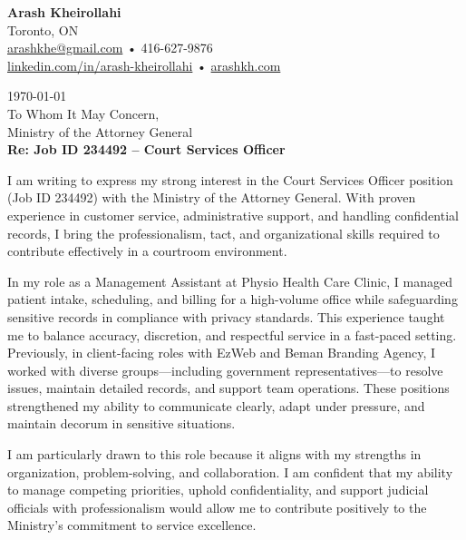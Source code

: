 \documentclass[letterpaper,10pt]{article}
\begin{document}

{\LARGE \textbf{Arash Kheirollahi}}\\[0.2em]
Toronto, ON \\
\href{mailto:arashkhe@gmail.com}{arashkhe@gmail.com} • 416-627-9876 \\
\href{https://linkedin.com/in/arash-kheirollahi}{linkedin.com/in/arash-kheirollahi} • \href{https://www.arashkh.com}{arashkh.com}

\vspace{1em}

\noindent\today \\[1em]

\noindent To Whom It May Concern, \\
Ministry of the Attorney General \\[0.5em]

\textbf{Re: Job ID 234492 – Court Services Officer}

\vspace{1em}

I am writing to express my strong interest in the Court Services Officer position (Job ID 234492) with the Ministry of the Attorney General. With proven experience in customer service, administrative support, and handling confidential records, I bring the professionalism, tact, and organizational skills required to contribute effectively in a courtroom environment.

In my role as a Management Assistant at Physio Health Care Clinic, I managed patient intake, scheduling, and billing for a high-volume office while safeguarding sensitive records in compliance with privacy standards. This experience taught me to balance accuracy, discretion, and respectful service in a fast-paced setting. Previously, in client-facing roles with EzWeb and Beman Branding Agency, I worked with diverse groups—including government representatives—to resolve issues, maintain detailed records, and support team operations. These positions strengthened my ability to communicate clearly, adapt under pressure, and maintain decorum in sensitive situations.

I am particularly drawn to this role because it aligns with my strengths in organization, problem-solving, and collaboration. I am confident that my ability to manage competing priorities, uphold confidentiality, and support judicial officials with professionalism would allow me to contribute positively to the Ministry’s commitment to service excellence.
\end{document}
